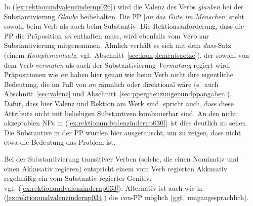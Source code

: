 In (\ref{ex:rektionundvalenzindernp026}) wird die Valenz des Verbs \textit{glauben} bei der Substantivierung \textit{Glaube} beibehalten.
Die PP [\textit{an das Gute im Menschen}] steht sowohl beim Verb als auch beim Substantiv.
Die Rektionsanforderung, dass die PP die Präposition \textit{an} enthalten muss, wird ebenfalls vom Verb zur Substantivierung mitgenommen.
Ähnlich verhält es sich mit dem \textit{dass}-Satz (einem \textit{Komplementsatz}, vgl.\ Abschnitt~\ref{sec:komplementsaetze}), der sowohl von dem Verb \textit{vermuten} als auch der Substantivierung \textit{Vermutung} regiert wird.
Präpositionen wie \textit{an} haben hier genau wie beim Verb nicht ihre eigentliche Bedeutung, die im Fall von \textit{an} räumlich oder direktional wäre (s.\ auch Abschnitt~\ref{sec:valenz} und Abschnitt~\ref{sec:ppergaenzungenundppangaben}).
Dafür, dass hier Valenz und Rektion am Werk sind, spricht auch, dass diese Attribute nicht mit beliebigen Substantiven kombinierbar sind.
An den nicht akzeptablen NPs in (\ref{ex:rektionundvalenzindernp030}) ist dies deutlich zu sehen.
Die Substantive in der PP wurden hier ausgetauscht, um zu zeigen, dass nicht etwa die Bedeutung das Problem ist.

\begin{exe}
  \ex\label{ex:rektionundvalenzindernp030}
  \begin{xlist}
  \end{xlist}
\end{exe}


Bei der Substantivierung transitiver Verben (solche, die einen Nominativ und einen Akkusativ regieren) entspricht einem vom Verb regierten Akkusativ regelmäßig ein vom Substantiv regierter Genitiv, vgl.\ (\ref{ex:rektionundvalenzindernp033}).
Alternativ ist auch wie in (\ref{ex:rektionundvalenzindernp034}) die \textit{von}-PP möglich (ggf.\ umgangssprachlich).

\begin{exe}
  \ex\label{ex:rektionundvalenzindernp031}
  \begin{xlist}
  \end{xlist}
\end{exe}

